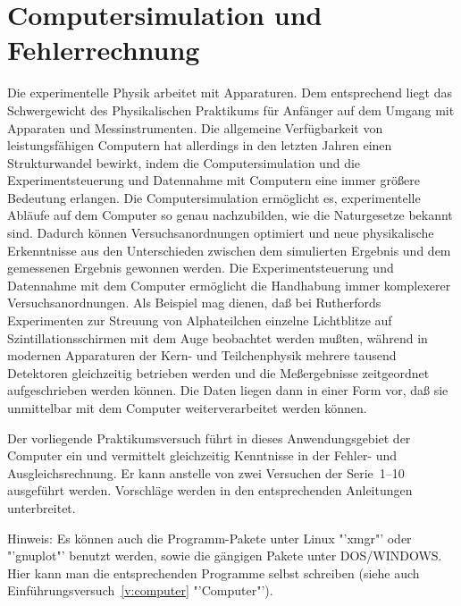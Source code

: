 

\chapter{Computersimulation und Fehlerrechnung} \label{v:fehler}


Die experimentelle Physik arbeitet mit Apparaturen. Dem entsprechend
liegt das Schwergewicht des Physikalischen Praktikums für Anfänger auf
dem Umgang mit Apparaten und Messinstrumenten. Die allgemeine
Verfügbarkeit von leistungsfähigen Computern hat allerdings in den
letzten Jahren einen Strukturwandel bewirkt, indem die
Computersimulation und die Experimentsteuerung und Datennahme mit
Computern eine immer größere Bedeutung erlangen. Die
Computersimulation ermöglicht es, experimentelle Abläufe auf dem
Computer so genau nachzubilden, wie die Naturgesetze bekannt sind.
Dadurch können Versuchsanordnungen optimiert und neue physikalische
Erkenntnisse aus den Unterschieden zwischen dem simulierten Ergebnis
und dem gemessenen Ergebnis gewonnen werden. Die Experimentsteuerung
und Datennahme mit dem Computer ermöglicht die Handhabung immer
komplexerer Versuchsanordnungen. Als Beispiel mag dienen, daß bei
Rutherfords Experimenten zur Streuung von Alphateilchen einzelne
Lichtblitze auf Szintillationsschirmen mit dem Auge beobachtet werden
mußten, während in modernen Apparaturen der Kern- und Teilchenphysik
mehrere tausend Detektoren gleichzeitig betrieben werden und die
Meßergebnisse zeitgeordnet aufgeschrieben werden können. Die Daten
liegen dann in einer Form vor, daß sie unmittelbar mit dem Computer
weiterverarbeitet werden können.

Der vorliegende Praktikumsversuch führt in dieses Anwendungsgebiet der
Computer ein und vermittelt gleichzeitig Kenntnisse in der Fehler- und
Ausgleichsrechnung. Er kann anstelle von zwei Versuchen der
Serie~1--10 ausgeführt werden. Vorschläge werden in den entsprechenden
Anleitungen unterbreitet.





Hinweis: Es können auch die Programm-Pakete unter Linux "'xmgr"' oder
"'gnuplot"' benutzt werden, sowie die gängigen Pakete unter
DOS/WINDOWS. Hier kann man die entsprechenden Programme selbst
schreiben (siehe auch Einführungsversuch~\ref{v:computer}
"'Computer"').


